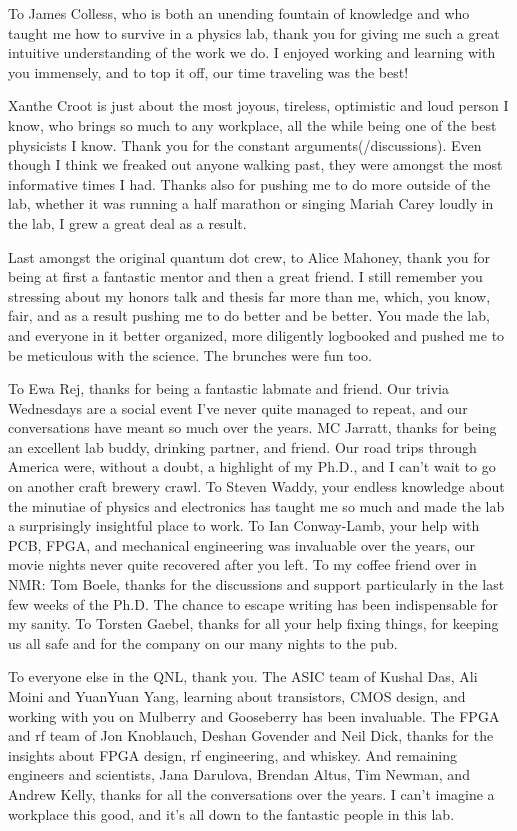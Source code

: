 To James Colless, who is both an unending fountain of knowledge and who taught me how to survive in a physics lab,
thank you for giving me such a great intuitive understanding of the work we do. I enjoyed working and learning with
you immensely, and to top it off, our time traveling was the best!

Xanthe Croot is just about the most joyous, tireless, optimistic and loud person I know, who brings so much to any
workplace, all the while being one of the best physicists I know. Thank you for the constant arguments(/discussions).
Even though I think we freaked out anyone walking past, they were amongst the most informative times I had.
Thanks also for pushing me to do more outside of the lab, whether it was running a half marathon or singing Mariah Carey
loudly in the lab, I grew a great deal as a result.

Last amongst the original quantum dot crew, to Alice Mahoney, thank you for being at first a fantastic mentor and then
a great friend. I still remember you stressing about my honors talk and thesis far more than me, which, you know, fair,
and as a result pushing me to do better and be better. You made the lab, and everyone in it better organized, more diligently
logbooked and pushed me to be meticulous with the science. The brunches were fun too.

To Ewa Rej, thanks for being a fantastic labmate and friend. Our trivia Wednesdays are a social event I've never quite managed
to repeat, and our conversations have meant so much over the years. MC Jarratt, thanks for being an excellent lab buddy, drinking
partner, and friend. Our road trips through America were, without a doubt, a highlight of my Ph.D., and I can't wait to go on another
craft brewery crawl. To Steven Waddy, your endless knowledge about the minutiae of physics and electronics has taught me so much and made the lab a surprisingly insightful place to work. To Ian Conway-Lamb, your help with PCB, FPGA, and mechanical engineering
was invaluable over the years, our movie nights never quite recovered after you left. To my coffee friend over in NMR: Tom Boele,
thanks for the discussions and support particularly in the last few weeks of the Ph.D. The chance to escape writing has been
indispensable for my sanity. To Torsten Gaebel, thanks for all your help fixing things, for keeping us all safe and for the
company on our many nights to the pub.

To everyone else in the QNL, thank you. The ASIC team of Kushal Das, Ali Moini and YuanYuan Yang, learning about transistors,
CMOS design, and working with you on Mulberry and Gooseberry has been invaluable. The FPGA and rf team of Jon Knoblauch, Deshan Govender
and Neil Dick, thanks for the insights about FPGA design, rf engineering, and whiskey. And remaining engineers and scientists,
Jana Darulova, Brendan Altus, Tim Newman, and Andrew Kelly, thanks for all the conversations over the years. I can't imagine a workplace
this good, and it's all down to the fantastic people in this lab.

